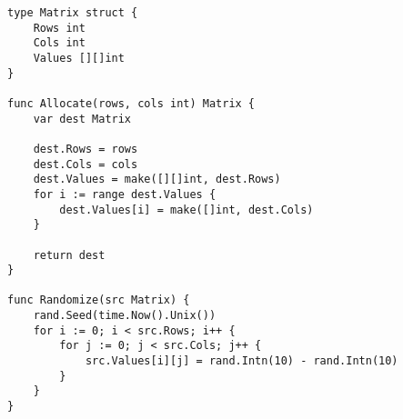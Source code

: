 \begin{lstlisting}[label=lst:mtx-util,caption=Пакет\, реализующий функции для работы с матрицами]
type Matrix struct {
	Rows int
	Cols int
	Values [][]int
}

func Allocate(rows, cols int) Matrix {
	var dest Matrix
	
	dest.Rows = rows
	dest.Cols = cols
	dest.Values = make([][]int, dest.Rows)
	for i := range dest.Values {
		dest.Values[i] = make([]int, dest.Cols)
	}
	
	return dest
}

func Randomize(src Matrix) {
	rand.Seed(time.Now().Unix())
	for i := 0; i < src.Rows; i++ {
		for j := 0; j < src.Cols; j++ {
			src.Values[i][j] = rand.Intn(10) - rand.Intn(10)
		}
	}
}
\end{lstlisting}

\captionsetup{singlelinecheck = false, justification=raggedleft}
